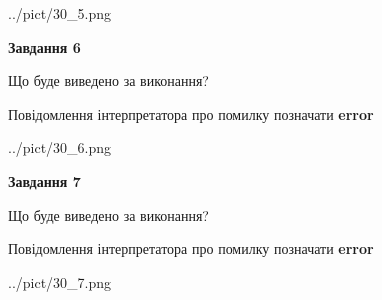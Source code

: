 \documentclass[10pt, ukrainian]{article}
\begin{document}
{\begin {large}
\begin{center}
	{../pict/30_5.png}
\end{center}
\newpage

{\begin {center}\textbf{Завдання 6}\end {center}}\par
Що буде виведено за виконання? \par
Повідомлення інтерпретатора про помилку позначати \textbf{error}

\begin{center}
	{../pict/30_6.png}
\end{center}
\newpage

{\begin {center}\textbf{Завдання 7}\end {center}}\par
Що буде виведено за виконання? \par
Повідомлення інтерпретатора про помилку позначати \textbf{error}

\begin{center}
	{../pict/30_7.png}
\end{center}
\newpage

\end {large}}
\end{document}
